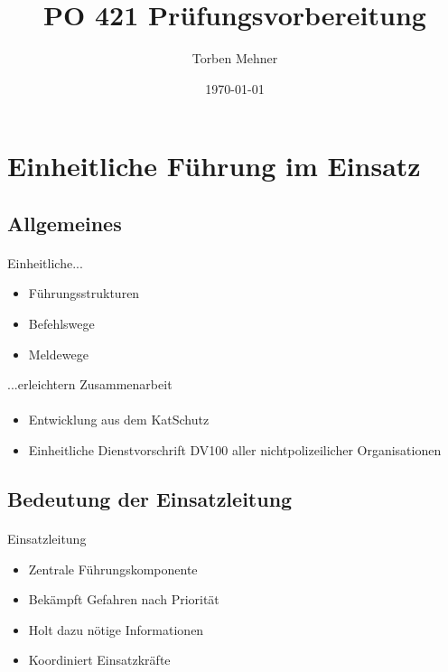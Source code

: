 \documentclass[]{beamer}
\title{PO 421 Prüfungsvorbereitung}
\subtitle{}
\author{Torben Mehner}
\institute{Bezirk Karlsruhe}
\date{\today}
\begin{document}
	

\section{Einheitliche Führung im Einsatz}
\subsection{Allgemeines}

\begin{frame}{\secname}
\framesubtitle{\subsecname}


Einheitliche...
\begin{itemize}
	\item Führungsstrukturen
	\item Befehlswege
	\item Meldewege
\end{itemize}
...erleichtern Zusammenarbeit

\end{frame}

\begin{frame}{\secname}
\framesubtitle{\subsecname}

\begin{itemize}
	\item Entwicklung aus dem KatSchutz
	\item Einheitliche Dienstvorschrift DV100 aller nichtpolizeilicher Organisationen
\end{itemize}

\end{frame}

\subsection{Bedeutung der Einsatzleitung}
\begin{frame}{\secname}
\framesubtitle{\subsecname}

Einsatzleitung
\begin{itemize}
	\item Zentrale Führungskomponente
	\item Bekämpft Gefahren nach Priorität
	\item Holt dazu nötige Informationen
	\item Koordiniert Einsatzkräfte
\end{itemize}

\end{frame}
\end{document}
